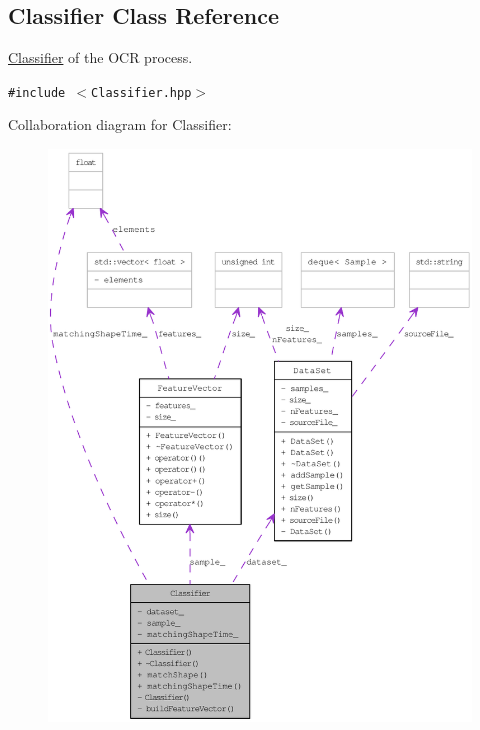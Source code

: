 \hypertarget{class_classifier}{
\subsection{Classifier Class Reference}
\label{class_classifier}
}
\hyperlink{class_classifier}{Classifier} of the OCR process.  


{\tt \#include $<$Classifier.hpp$>$}

Collaboration diagram for Classifier:\nopagebreak
\begin{figure}[H]
\begin{center}
\leavevmode
\includegraphics[width=400pt]{class_classifier__coll__graph}
\end{center}
\end{figure}
